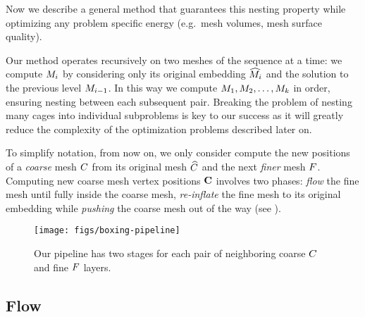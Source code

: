 Now we describe a general method that guarantees this nesting property while
optimizing any problem specific energy (e.g.\ mesh
volumes, mesh surface quality).

Our method operates recursively on two meshes of the sequence at a time: we
compute $M_i$ by considering only its original embedding $\widehat{M}_i$ and the
solution to the previous level $M_{i-1}$. 
%
In this way we compute $M_1,M_2,\dots,M_k$ in order, ensuring
nesting between each subsequent pair.
%
Breaking the problem of nesting many cages into individual subproblems is key
to our success as it will greatly reduce the complexity of the optimization
problems described later on.

To simplify notation, from now on, we only consider compute the new positions
of a \emph{coarse} mesh $C$ from its original mesh $\widehat{C}$ and the next
\emph{finer} mesh $F$. 
%
Computing new coarse mesh vertex positions $\mathbf{C}$ involves two phases:
\emph{flow} the fine mesh until fully inside the coarse mesh, \emph{re-inflate}
the fine mesh to its original embedding while \emph{pushing} the coarse mesh
out of the way (see ).

\begin{figure}
  \texttt{[image: figs/boxing-pipeline]}
  \caption{Our pipeline has two stages for each pair of neighboring coarse
  $C$ and fine $F$ layers.}
  \label{fig:boxing-pipeline}
\end{figure}

\subsection{Flow}
\label{sec:flow}

